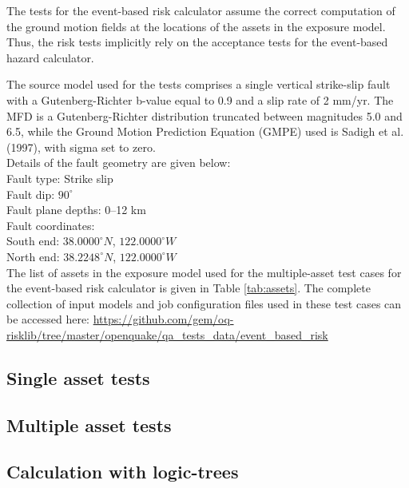 The tests for the event-based risk calculator assume the correct computation of the ground motion fields at the locations of the assets in the exposure model. Thus, the risk tests implicitly rely on the acceptance tests for the event-based hazard calculator.

The source model used for the tests comprises a single vertical strike-slip fault with a Gutenberg-Richter b-value equal to 0.9 and a slip rate of 2 mm/yr. The MFD is a Gutenberg-Richter distribution truncated between magnitudes 5.0 and 6.5, while the Ground Motion Prediction Equation (GMPE) used is Sadigh et al. (1997), with sigma set to zero.\\

\noindent Details of the fault geometry are given below:\\

\noindent
Fault type: Strike slip\\
Fault dip: $90^{\circ}$\\
Fault plane depths: 0--12 km\\
Fault coordinates:\\
South end: $38.0000^{\circ} N$, $122.0000^{\circ} W$\\
North end: $38.2248^{\circ} N$, $122.0000^{\circ} W$\\



The list of assets in the exposure model used for the multiple-asset test cases for the event-based risk calculator is given in Table \ref{tab:assets}. The complete collection of input models and job configuration files used in these test cases can be accessed here:
\href{https://github.com/gem/oq-risklib/tree/master/openquake/qa_tests_data/event_based_risk}
{https://github.com/gem/oq-risklib/tree/master/openquake/qa\_tests\_data/event\_based\_risk}

\subsection{Single asset tests}
\label{subsec:eventbased-single}

\subsection{Multiple asset tests}
\label{subsec:eventbased-multiple}

\subsection{Calculation with logic-trees}
\label{subsec:eventbased-logictrees}